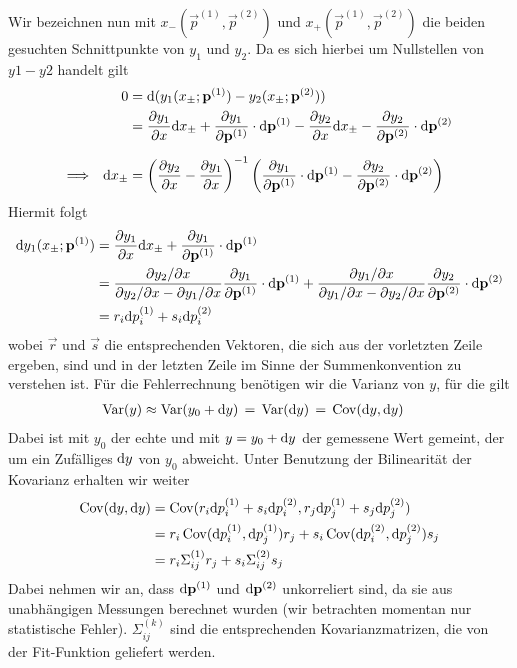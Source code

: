 Wir bezeichnen nun mit $x_{-}(\vec{p}^{(1)}, \vec{p}^{(2)})$ und $x_{+}(\vec{p}^{(1)}, \vec{p}^{(2)})$ die beiden gesuchten Schnittpunkte von $y_1$ und $y_2$. Da es sich hierbei um Nullstellen von $y1 - y2$ handelt gilt
%
\begin{align*}
               && 0 &= \mathrm{d}(y_1(x_{\pm}; \mathbf{p}^{(1)}) - y_2(x_{\pm}; \mathbf{p}^{(2)})) \\
                 && &=  \frac{\partial y_1}{\partial x} \mathrm{d} x_{\pm} + \frac{\partial y_1}{\partial \mathbf{p}^{(1)}} \cdot \mathrm{d} \mathbf{p}^{(1)}
                      - \frac{\partial y_2}{\partial x} \mathrm{d} x_{\pm} - \frac{\partial y_2}{\partial \mathbf{p}^{(2)}} \cdot \mathrm{d} \mathbf{p}^{(2)} \\[2mm]
\Longrightarrow&& \mathrm{d} x_{\pm} &= \left(\frac{\partial y_2}{\partial x} - \frac{\partial y_1}{\partial x}\right)^{-1}
                                \left( \frac{\partial y_1}{\partial \mathbf{p}^{(1)}}\cdot \mathrm{d} \mathbf{p}^{(1)} - \frac{\partial y_2}{\partial \mathbf{p}^{(2)}} \cdot \mathrm{d} \mathbf{p}^{(2)} \right)
\end{align*}
%
Hiermit folgt
%
\begin{align*}
    \mathrm{d} y_1(x_{\pm}; \mathbf{p}^{(1)}) &= \frac{\partial y_1}{\partial x} \mathrm{d} x_{\pm} + \frac{\partial y_1}{\partial \mathbf{p}^{(1)}} \cdot \mathrm{d} \mathbf{p}^{(1)} \\
                                   &= \frac{\partial y_2 / \partial x}{\partial y_2 / \partial x - \partial y_1 / \partial x} \frac{\partial y_1}{\partial \mathbf{p}^{(1)}} \cdot \mathrm{d} \mathbf{p}^{(1)} + 
                                   \frac{\partial y_1 / \partial x}{\partial y_1 / \partial x - \partial y_2 / \partial x} \frac{\partial y_2}{\partial \mathbf{p}^{(2)}} \cdot \mathrm{d} \mathbf{p}^{(2)} \\
                                   &= r_i \mathrm{d} p^{(1)}_i + s_i \mathrm{d} p^{(2)}_i
\end{align*}
%
wobei $\vec{r}$ und $\vec{s}$ die entsprechenden Vektoren, die sich aus der vorletzten Zeile ergeben, sind und in der letzten Zeile im Sinne der Summenkonvention zu verstehen ist.
Für die Fehlerrechnung benötigen wir die Varianz von $y$, für die gilt
\begin{align*}
    \operatorname{Var}(y) &\approx \operatorname{Var}(y_0 + \mathrm{d} y) \,=\, \operatorname{Var}(\mathrm{d} y) \,=\, \operatorname{Cov}(\mathrm{d} y, \mathrm{d} y)
\end{align*}
Dabei ist mit $y_0$ der echte und mit $y = y_0 + \mathrm{d} y$ der gemessene Wert gemeint, der um ein Zufälliges $\mathrm{d} y$ von $y_0$ abweicht. Unter Benutzung der Bilinearität der Kovarianz erhalten wir weiter
%
\begin{align*}
\operatorname{Cov}(\mathrm{d} y, \mathrm{d} y) &= \operatorname{Cov}(r_i \mathrm{d} p^{(1)}_i + s_i \mathrm{d} p^{(2)}_i, r_j \mathrm{d} p^{(1)}_j + s_j \mathrm{d} p^{(2)}_j) \\
            &= r_i \operatorname{Cov}(\mathrm{d} p^{(1)}_i, \mathrm{d} p^{(1)}_j) r_j + s_i \operatorname{Cov}(\mathrm{d} p^{(2)}_i, \mathrm{d} p^{(2)}_j) s_j \\
            &= r_i \Sigma^{(1)}_{i j} r_j + s_i \Sigma^{(2)}_{i j} s_j
\end{align*}
%
Dabei nehmen wir an, dass $\mathrm{d} \mathbf{p}^{(1)}$ und $\mathrm{d} \mathbf{p}^{(2)}$ unkorreliert sind, da sie aus unabhängigen Messungen berechnet wurden (wir betrachten momentan nur statistische Fehler). $\Sigma^{(k)}_{i j}$ sind die entsprechenden Kovarianzmatrizen, die von der Fit-Funktion geliefert werden. 



